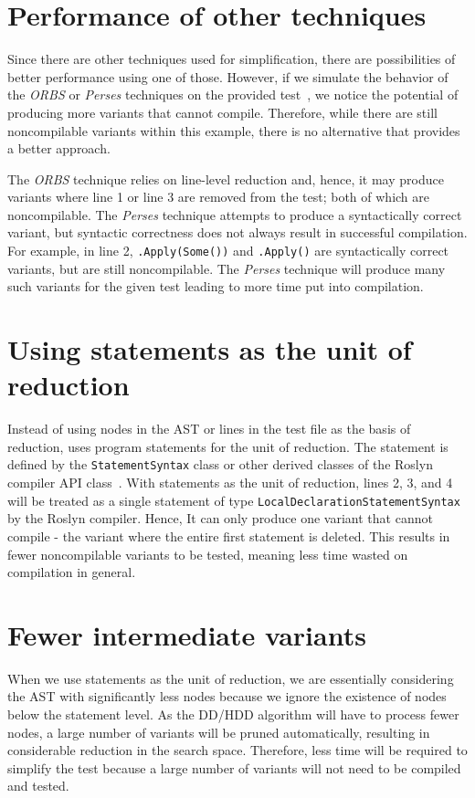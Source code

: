 \section{Performance of other techniques}
Since there are other techniques used for simplification, there are possibilities of better performance using one of those. However, if we simulate the behavior of the \emph{ORBS} or \emph{Perses} techniques on the provided test~\cite{fig:applySomeArgs}, we notice the potential of producing more variants that cannot compile. Therefore, while there are still noncompilable variants within this example, there is no alternative that provides a better approach.

The \emph{ORBS} technique relies on line-level reduction and, hence, it may produce variants where line 1 or line 3 are removed from the test; both of which are noncompilable. The \emph{Perses} technique attempts to produce a syntactically correct variant, but syntactic correctness does not always result in successful compilation. For example, in line 2, \texttt{.Apply(Some())} and \texttt{.Apply()} are syntactically correct variants, but are still noncompilable. The \emph{Perses} technique will produce many such variants for the given test leading to more time put into compilation.


\section{Using statements as the unit of reduction}
Instead of using nodes in the AST or lines in the test file as the basis of reduction, \mytool uses program statements for the unit of reduction. The statement is defined by the \texttt{StatementSyntax} class or other derived classes of the Roslyn compiler API class~\cite{wagner_2021}. With statements as the unit of reduction, lines 2, 3, and 4 will be treated as a single statement of type \texttt{LocalDeclarationStatementSyntax} by the Roslyn compiler. Hence, It can only produce one variant that cannot compile - the variant where the entire first statement is deleted. This results in fewer noncompilable variants to be tested, meaning less time wasted on compilation in general.

\section{Fewer intermediate variants}
When we use statements as the unit of reduction, we are essentially considering the AST with significantly less nodes because we ignore the existence of nodes below the statement level. As the DD/HDD algorithm will have to process fewer nodes, a large number of variants will be pruned automatically, resulting in considerable reduction in the search space. Therefore, less time will be required to simplify the test because a large number of variants will not need to be compiled and tested.

